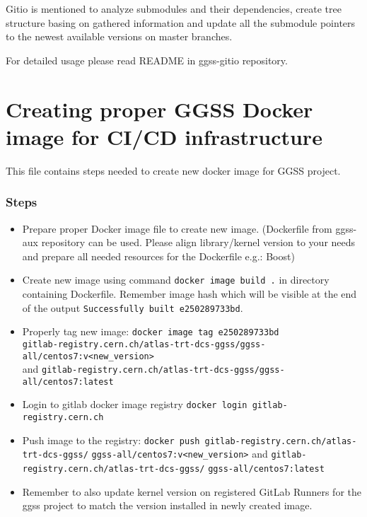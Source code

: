 Gitio is mentioned to analyze submodules and their dependencies, create tree structure basing on gathered information and update all the submodule pointers to the newest available versions on master branches.

For detailed usage please read README in ggss-gitio repository.

\clearpage
\section{Creating proper GGSS Docker image for CI/CD infrastructure}
This file contains steps needed to create new docker image for GGSS project.

\subsubsection*{Steps}
\begin{itemize}
    \item Prepare proper Docker image file to create new image. (Dockerfile from ggss-aux repository can be used. Please align library/kernel version to your needs and prepare all needed resources for the Dockerfile e.g.: Boost)
    \item Create new image using command \lstinline{docker image build .} in directory containing Dockerfile. Remember image hash which will be visible at the end of the output \lstinline{Successfully built e250289733bd}.
    \item Properly tag new image:
    \lstinline{docker image tag e250289733bd} \\
    \lstinline{gitlab-registry.cern.ch/atlas-trt-dcs-ggss/ggss-all/centos7:v<new_version>} \\
    and \lstinline{gitlab-registry.cern.ch/atlas-trt-dcs-ggss/ggss-all/centos7:latest}
    \item Login to gitlab docker image registry \lstinline{docker login gitlab-registry.cern.ch}
    \item Push image to the registry: \lstinline{docker push gitlab-registry.cern.ch/atlas-trt-dcs-ggss/} \lstinline{ggss-all/centos7:v<new_version>} and \lstinline{gitlab-registry.cern.ch/atlas-trt-dcs-ggss/} \lstinline{ggss-all/centos7:latest}
    \item Remember to also update kernel version on registered GitLab Runners for the ggss project to match the version installed in newly created image.
\end{itemize}

\clearpage

